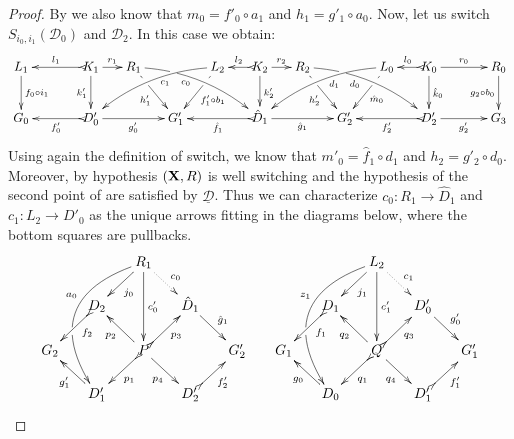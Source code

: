 \documentclass[a4paper,UKenglish,cleveref,pdftex,thm-restate,numberwithinsect,anonymous]{lipics}
\def\R{\mathsf{R}}
\def\X{\textbf {\textup{X}}}
\def\G{\textbf {\textup{G}}}
\newcommand{\dder}[1]{\mathscr{#1}}
\newcommand{\der}[1]{\underline{\dder{#1}}}
\begin{document}
\begin{proof}
	By  we also know that $m_0=f'_0\circ a_1$ and $h_1=g'_1\circ a_0$. Now, let us switch $S_{i_0, i_1}(\dder{D}_0)$ and $\dder{D}_2$. In this case we obtain:
	\[\xymatrix@C=15pt{L_1\ar[d]^{f_0\circ i_1}&& K_1 \ar[d]_{k'_1}\ar@{>->}[ll]_{l_1} \ar[r]^{r_1} & R_1 \ar@/^.35cm/[drrr]_(.4){c_0}|(.285)\hole \ar[dr]|(.28)\hole_{h'_1} && L_2 \ar@/_.35cm/[dlll]^(.4){c_1} \ar[dl]|(.28)\hole^{f'_1\circ b_1}& K_2 \ar[d]^{k'_2}\ar@{>->}[l]_{l_2} \ar[r]^{r_2} & R_2 \ar[dr]|(.28)\hole_{h'_2} \ar@/^.35cm/[drrr]_(.4){d_0}|(.285)\hole  && L_0 \ar@/_.35cm/[dlll]^(.4){d_1} \ar[dl]|(.28)\hole^{\hat{m}_0}& K_0 \ar[d]^{\hat{k}_0}\ar@{>->}[l]_{l_0} \ar[rr]^{r_0} && R_0 \ar[d]_{g_2\circ b_0} \\G_0 && \ar@{>->}[ll]^{f'_0} D'_0 \ar[rr]_{g'_0}&& G'_1  && \ar@{>->}[ll]^{\hat{f}_1} \hat{D}_1 \ar[rr]_{\hat{g}_1}&& G'_2 && \ar@{>->}[ll]^{f'_2} D'_2 \ar[rr]_{g'_2}&& G_3 }\]
	Using again the definition of switch, we know that $m'_0=\hat{f}_1\circ d_1$ and $h_2=g'_2\circ d_0$. Moreover, by hypothesis $(\X, \R)$ is well switching and the hypothesis of the second point of  are satisfied by $\der{D}$. Thus we can characterize $c_0\colon R_1\to \hat{D}_1$ and $c_1\colon L_2\to D'_0$ as the unique arrows fitting in the diagrams below, where the bottom squares are pullbacks.
	\[\xymatrix@R=15pt@C=15pt{&&R_1 \ar@/_1.2cm/[dddl]_(.4){a_0}|(.63)\hole\ar[dl]^{j_0}\ar[dd]^{c'_0} \ar@{.>}[dr]^{c_0}&&&&&L_2 \ar[dl]^{j_1} \ar@/_1.2cm/[dddl]_(.4){z_1}|(.63)\hole\ar[dd]^{c'_1} \ar@{.>}[dr]^{c_1}\\&D_2 \ar@{>->}[dl]^(.4){f_2}&&\hat{D}_1 \ar[dr]^{\hat{g}_1}  &&&D_1 \ar@{>->}[dl]^(.4){f_1}&&D'_0 \ar[dr]^{g'_0}\\G_2 && P\ar[dr]_{p_4} \ar@{>->}[ur]_{p_3}\ar@{>->}[dl]^{p_1} \ar[ul]^{p_2}&&G'_2&G_1 && Q\ar[dr]_{q_4} \ar@{>->}[ur]_{q_3}\ar@{>->}[dl]^{q_1} \ar[ul]^{q_2}&&G'_1\\& D'_1 \ar[ul]^{g'_1}&&D'_2 \ar@{>->}[ur]_{f'_2}&&& D_0 \ar[ul]^{g_0}&&D'_1 \ar@{>->}[ur]_{f'_1}}\]
	

\end{proof}
\end{document}
